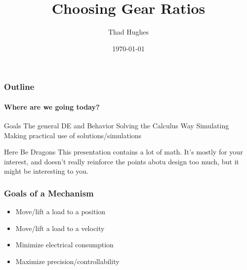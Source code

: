 \documentclass{beamer}%
\title{Choosing Gear Ratios}
\author{Thad Hughes}
\date{\today}
\begin{document}
\maketitle

\begin{frame}
\frametitle{Outline}
\framesubtitle{Where are we going today?}

\begin{outline}
	\1 Goals
	\1 The general DE and Behavior
	\1 Solving the Calculus Way
	\1 Simulating
	\1 Making practical use of solutions/simulations
\end{outline}

\begin{alertblock}{Here Be Dragons}
	This presentation contains a lot of math. It's mostly for your interest, and doesn't really reinforce the points abotu design too much, but it might be interesting to you.
\end{alertblock}

\end{frame}

\begin{frame}
	\frametitle{Goals of a Mechanism}
	\begin{itemize}
		\item Move/lift a load to a position
		\item Move/lift a load to a velocity
		\item Minimize electrical consumption
		\item Maximize precision/controllability
	\end{itemize}
\end{frame}
\end{document}
